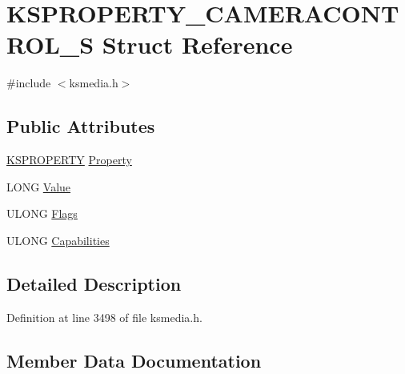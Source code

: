\hypertarget{struct_k_s_p_r_o_p_e_r_t_y___c_a_m_e_r_a_c_o_n_t_r_o_l___s}{}\section{K\+S\+P\+R\+O\+P\+E\+R\+T\+Y\+\_\+\+C\+A\+M\+E\+R\+A\+C\+O\+N\+T\+R\+O\+L\+\_\+S Struct Reference}
\label{struct_k_s_p_r_o_p_e_r_t_y___c_a_m_e_r_a_c_o_n_t_r_o_l___s}


{\ttfamily \#include $<$ksmedia.\+h$>$}

\subsection*{Public Attributes}
\begin{DoxyCompactItemize}
\item 
\hyperlink{ks_8h_a4392f77c74e868d813d46c39ada4d660}{K\+S\+P\+R\+O\+P\+E\+R\+TY} \hyperlink{struct_k_s_p_r_o_p_e_r_t_y___c_a_m_e_r_a_c_o_n_t_r_o_l___s_ab2d424ae09cadb233c54ea1a3ae0bfdc}{Property}
\item 
L\+O\+NG \hyperlink{struct_k_s_p_r_o_p_e_r_t_y___c_a_m_e_r_a_c_o_n_t_r_o_l___s_a47a420209e94a9d7bdb62058e6112e3c}{Value}
\item 
U\+L\+O\+NG \hyperlink{struct_k_s_p_r_o_p_e_r_t_y___c_a_m_e_r_a_c_o_n_t_r_o_l___s_a61ff315d837bd4b4e534be698e4a300f}{Flags}
\item 
U\+L\+O\+NG \hyperlink{struct_k_s_p_r_o_p_e_r_t_y___c_a_m_e_r_a_c_o_n_t_r_o_l___s_a4c6d7e7f44d4f41bb1e65c19fe1e37b1}{Capabilities}
\end{DoxyCompactItemize}


\subsection{Detailed Description}


Definition at line 3498 of file ksmedia.\+h.



\subsection{Member Data Documentation}
